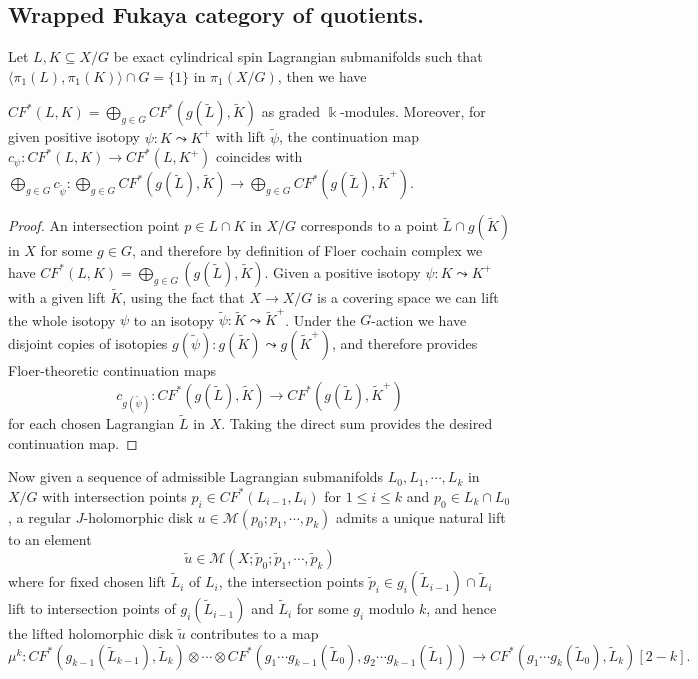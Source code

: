 \subsection{Wrapped Fukaya category of quotients.} Let $L,K\subseteq X/G$ be exact cylindrical spin Lagrangian submanifolds such that $\langle\pi_1 (L),\pi_1 (K)\rangle\cap G= \{1\}$ in $\pi_1 (X/G)$, then we have
\begin{prp}
    $CF^{\ast} (L,K) =\displaystyle\bigoplus_{g\in G} CF^{\ast} (g(\tilde{L}),\tilde{K})$ as graded $\Bbbk$-modules. Moreover, for given positive isotopy $\psi\colon K\leadsto K^+$ with lift $\tilde{\psi}$, the continuation map $c_{\psi}\colon CF^{\ast} (L,K)\to CF^{\ast} (L,K^+)$ coincides with $\displaystyle\bigoplus_{g\in G} c_{\tilde{\psi}}\colon \bigoplus_{g\in G} CF^{\ast} (g(\tilde{L}),\tilde{K})\to\bigoplus_{g\in G} CF^{\ast} (g(\tilde{L}),\tilde{K}^+)$.
\end{prp}
\begin{proof}
    An intersection point $p\in L\cap K$ in $X/G$ corresponds to a point $\tilde{L}\cap g(\tilde{K})$ in $X$ for some $g\in G$, and therefore by definition of Floer cochain complex we have $CF^{\ast} (L,K)=\displaystyle\bigoplus_{g\in G} (g(\tilde{L}), \tilde{K})$. Given a positive isotopy $\psi\colon K\leadsto K^+$ with a given lift $\tilde{K}$, using the fact that $X\to X/G$ is a covering space we can lift the whole isotopy $\psi$ to an isotopy $\tilde{\psi}\colon \tilde{K}\leadsto\tilde{K}^+$. Under the $G$-action we have disjoint copies of isotopies $g(\tilde{\psi})\colon g(\tilde{K})\leadsto g(\tilde{K}^+)$, and therefore provides Floer-theoretic continuation maps \[
        c_{g(\tilde{\psi})}\colon CF^{\ast} (g(\tilde{L}),\tilde{K})\to CF^{\ast} (g(\tilde{L}),\tilde{K}^+)
    \]for each chosen Lagrangian $\tilde{L}$ in $X$. Taking the direct sum provides the desired continuation map.
\end{proof}
Now given a sequence of admissible Lagrangian submanifolds $L_0, L_1,\dotsb ,L_k$ in $X/G$ with intersection points $p_i\in CF^{\ast} (L_{i-1}, L_i)$ for $1\leq i\leq k$ and $p_0\in L_k\cap L_0$, a regular $J$-holomorphic disk $u\in\mathcal{M} (p_0;p_1,\dotsb ,p_k)$ admits a unique natural lift to an element \[
\tilde{u}\in\mathcal{M}(X;\tilde{p}_0;\tilde{p}_1,\dotsb ,\tilde{p}_k)
\]where for fixed chosen lift $\tilde{L}_i$ of $L_i$, the intersection points $\tilde{p}_i\in g_i(\tilde{L}_{i-1})\cap\tilde{L}_i$ lift to intersection points of $g_i (\tilde{L}_{i-1})$ and $\tilde{L}_i$ for some $g_i$ modulo $k$, and hence the lifted holomorphic disk $\tilde{u}$ contributes to a map \[
\mu^k\colon CF^{\ast} (g_{k-1}(\tilde{L}_{k-1}),\tilde{L}_k)\otimes\dotsb\otimes CF^{\ast} (g_1\dotsb g_{k-1}(\tilde{L}_0),g_2\dotsb g_{k-1} (\tilde{L}_1))\to CF^{\ast} (g_1\dotsb g_k (\tilde{L}_0),\tilde{L}_k)[2-k].
\]
